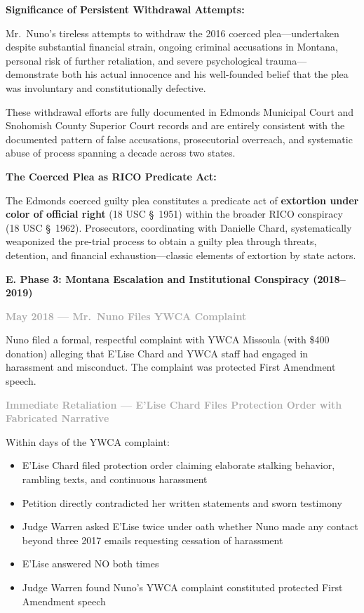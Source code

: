 \documentclass[11pt, letterpaper]{article}
\newcommand{\subsectiontitle}[1]{\vspace{0.15in}\noindent\textcolor{NavyBlue}{\textbf{#1}}\vspace{0.05in}}
\newcommand{\subsubsectiontitle}[1]{\vspace{0.1in}\noindent\textcolor{DarkGray}{\textbf{#1}}\vspace{0.05in}}
\begin{document}
\textbf{Significance of Persistent Withdrawal Attempts:}

Mr.\ Nuno's tireless attempts to withdraw the 2016 coerced plea---undertaken despite substantial financial strain, ongoing criminal accusations in Montana, personal risk of further retaliation, and severe psychological trauma---demonstrate both his actual innocence and his well-founded belief that the plea was involuntary and constitutionally defective.

These withdrawal efforts are fully documented in Edmonds Municipal Court and Snohomish County Superior Court records and are entirely consistent with the documented pattern of false accusations, prosecutorial overreach, and systematic abuse of process spanning a decade across two states.

\textbf{The Coerced Plea as RICO Predicate Act:}

The Edmonds coerced guilty plea constitutes a predicate act of \textbf{extortion under color of official right} (18 USC \S\ 1951) within the broader RICO conspiracy (18 USC \S\ 1962). Prosecutors, coordinating with Danielle Chard, systematically weaponized the pre-trial process to obtain a guilty plea through threats, detention, and financial exhaustion---classic elements of extortion by state actors.

\subsectiontitle{E. Phase 3: Montana Escalation and Institutional Conspiracy (2018--2019)}

\subsubsectiontitle{May 2018 --- Mr.\ Nuno Files YWCA Complaint}

Nuno filed a formal, respectful complaint with YWCA Missoula (with \$400 donation) alleging that E'Lise Chard and YWCA staff had engaged in harassment and misconduct. The complaint was protected First Amendment speech.

\subsubsectiontitle{Immediate Retaliation --- E'Lise Chard Files Protection Order with Fabricated Narrative}

Within days of the YWCA complaint:
\begin{itemize}[leftmargin=*,itemsep=2pt]
    \item E'Lise Chard filed protection order claiming elaborate stalking behavior, rambling texts, and continuous harassment
    \item Petition directly contradicted her written statements and sworn testimony
    \item Judge Warren asked E'Lise twice under oath whether Nuno made any contact beyond three 2017 emails requesting cessation of harassment
    \item E'Lise answered NO both times
    \item Judge Warren found Nuno's YWCA complaint constituted protected First Amendment speech
\end{itemize}
\end{document}
